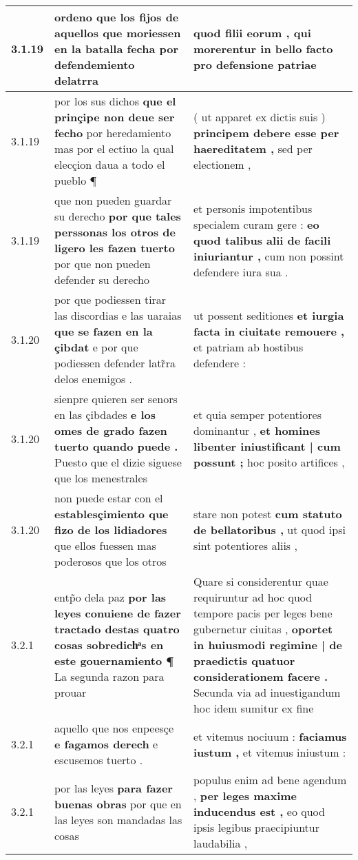\begin{tabular}{|p{1cm}|p{6.5cm}|p{6.5cm}|}
3.1.19 & ordeno que los fijos de aquellos \textbf{ que moriessen en la batalla fecha } por defendemiento delatrra & quod filii eorum , \textbf{ qui morerentur in bello facto } pro defensione patriae \\\hline
3.1.19 & por los sus dichos \textbf{ que el prinçipe non deue ser fecho } por heredamiento mas por el ectiuo la qual elecçion daua a todo el pueblo ¶ & ( ut apparet ex dictis suis ) \textbf{ principem debere esse per haereditatem , } sed per electionem , \\\hline
3.1.19 & que non pueden guardar su derecho \textbf{ por que tales perssonas los otros de ligero les fazen tuerto } por que non pueden defender su derecho & et personis impotentibus specialem curam gere : \textbf{ eo quod talibus alii de facili iniuriantur , } cum non possint defendere iura sua . \\\hline
3.1.20 & por que podiessen tirar las discordias e las uaraias \textbf{ que se fazen en la çibdat } e por que podiessen defender latr̃ra delos enemigos . & ut possent seditiones \textbf{ et iurgia facta in ciuitate remouere , } et patriam ab hostibus defendere : \\\hline
3.1.20 & sienpre quieren ser senors en las çibdades \textbf{ e los omes de grado fazen tuerto quando puede . } Puesto que el dizie siguese que los menestrales & et quia semper potentiores dominantur , \textbf{ et homines libenter iniustificant | cum possunt ; } hoc posito artifices , \\\hline
3.1.20 & non puede estar con el \textbf{ establesçimiento que fizo de los lidiadores } que ellos fuessen mas poderosos que los otros & stare non potest \textbf{ cum statuto de bellatoribus , } ut quod ipsi sint potentiores aliis , \\\hline
3.2.1 & entp̃o dela paz \textbf{ por las leyes conuiene de fazer tractado destas quatro cosas sobredichͣs en este gouernamiento ¶ } La segunda razon para prouar & Quare si considerentur quae requiruntur ad hoc quod tempore pacis per leges bene gubernetur ciuitas , \textbf{ oportet in huiusmodi regimine | de praedictis quatuor considerationem facere . } Secunda via ad inuestigandum hoc idem sumitur ex fine \\\hline
3.2.1 & aquello que nos enpeesçe \textbf{ e fagamos derech } e escusemos tuerto . & et vitemus nociuum : \textbf{ faciamus iustum , } et vitemus iniustum : \\\hline
3.2.1 & por las leyes \textbf{ para fazer buenas obras } por que en las leyes son mandadas las cosas & populus enim ad bene agendum , \textbf{ per leges maxime inducendus est , } eo quod ipsis legibus praecipiuntur laudabilia , \\\hline

\end{tabular}
